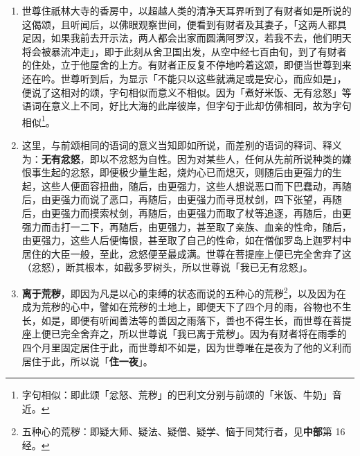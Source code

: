 \begin{enumerate}\item 世尊住祇林大寺的香房中，以超越人类的清净天耳界听到了有财者如是所说的这偈颂，且听闻后，以佛眼观察世间，便看到有财者及其妻子，「这两人都具足因，如果我前去开示法，两人都会出家而圆满阿罗汉，若我不去，他们明天将会被暴流冲走」，即于此刻从舍卫国出发，从空中经七百由旬，到了有财者的住处，立于他屋舍的上方。有财者正反复不停地吟着这颂，即便当世尊到来还在吟。世尊听到后，为显示「不能只以这些就满足或是安心，而应如是」，便说了这相对的颂，字句相似而意义不相似。因为「煮好米饭、无有忿怒」等语词在意义上不同，好比大海的此岸彼岸，但字句于此却仿佛相同，故为字句相似\footnote{字句相似：即此颂「忿怒、荒秽」的巴利文分别与前颂的「米饭、牛奶」音近。}。
\item 这里，与前颂相同的语词的意义当知即如所说，而差别的语词的释词、释义为：\textbf{无有忿怒}，即以不忿怒为自性。因为对某些人，任何从先前所说种类的嫌恨事生起的忿怒，即便极少量生起，烧灼心已而熄灭，则随后由更强力的生起，这些人便面容扭曲，随后，由更强力，这些人想说恶口而下巴蠢动，再随后，由更强力而说了恶口，再随后，由更强力而寻觅杖剑，四下张望，再随后，由更强力而摸索杖剑，再随后，由更强力而取了杖等追逐，再随后，由更强力而击打一二下，再随后，由更强力，甚至取了亲族、血亲的性命，随后，由更强力，这些人后便悔恨，甚至取了自己的性命，如在僧伽罗岛上迦罗村中居住的大臣一般，至此，忿怒便至最成满。世尊在菩提座上便已完全舍弃了这（忿怒），断其根本，如截多罗树头，所以世尊说「我已无有忿怒」。
\item \textbf{离于荒秽}，即因为凡是以心的束缚的状态而说的五种心的荒秽\footnote{五种心的荒秽：即疑大师、疑法、疑僧、疑学、恼于同梵行者，见\textbf{中部}第 16 经。}，以及因为在成为荒秽的心中，譬如在荒秽的土地上，即便天下了四个月的雨，谷物也不生长，如是，即便有听闻善法等的善因之雨落下，善也不得生长，而世尊在菩提座上便已完全舍弃之，所以世尊说「我已离于荒秽」。因为有财者将在雨季的四个月里固定居住于此，而世尊却不如是，因为世尊唯在是夜为了他的义利而居住于此，所以说「\textbf{住一夜}」。

\end{enumerate}
